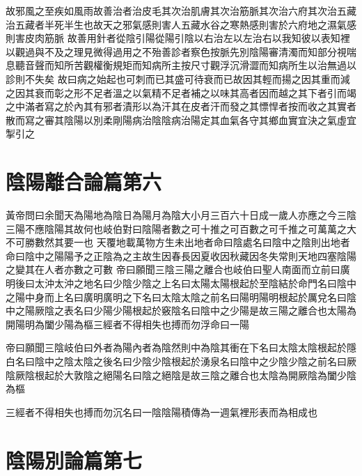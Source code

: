 故邪風之至疾如風雨故善治者治皮毛其次治肌膚其次治筋脈其次治六府其次治五藏治五藏者半死半生也故天之邪氣感則害人五藏水谷之寒熱感則害於六府地之濕氣感則害皮肉筋脈
故善用針者從陰引陽從陽引陰以右治左以左治右以我知彼以表知裡以觀過與不及之理見微得過用之不殆善診者察色按脈先別陰陽審清濁而知部分視喘息聽音聲而知所苦觀權衡規矩而知病所主按尺寸觀浮沉滑澀而知病所生以治無過以診則不失矣
故曰病之始起也可刺而已其盛可待衰而已故因其輕而揚之因其重而減之因其衰而彰之形不足者溫之以氣精不足者補之以味其高者因而越之其下者引而竭之中滿者寫之於內其有邪者漬形以為汗其在皮者汗而發之其慓悍者按而收之其實者散而寫之審其陰陽以別柔剛陽病治陰陰病治陽定其血氣各守其鄉血實宜決之氣虛宜掣引之

\section{陰陽離合論篇第六}

黃帝問曰余聞天為陽地為陰日為陽月為陰大小月三百六十日成一歲人亦應之今三陰三陽不應陰陽其故何也岐伯對曰陰陽者數之可十推之可百數之可千推之可萬萬之大不可勝數然其要一也
天覆地載萬物方生未出地者命曰陰處名曰陰中之陰則出地者命曰陰中之陽陽予之正陰為之主故生因春長因夏收因秋藏因冬失常則天地四塞陰陽之變其在人者亦數之可數
帝曰願聞三陰三陽之離合也岐伯曰聖人南面而立前曰廣明後曰太沖太沖之地名曰少陰少陰之上名曰太陽太陽根起於至陰結於命門名曰陰中之陽中身而上名曰廣明廣明之下名曰太陰太陰之前名曰陽明陽明根起於厲兌名曰陰中之陽厥陰之表名曰少陽少陽根起於竅陰名曰陰中之少陽是故三陽之離合也太陽為開陽明為闔少陽為樞三經者不得相失也搏而勿浮命曰一陽

帝曰願聞三陰岐伯曰外者為陽內者為陰然則中為陰其衝在下名曰太陰太陰根起於隱白名曰陰中之陰太陰之後名曰少陰少陰根起於湧泉名曰陰中之少陰少陰之前名曰厥陰厥陰根起於大敦陰之絕陽名曰陰之絕陰是故三陰之離合也太陰為開厥陰為闔少陰為樞

三經者不得相失也搏而勿沉名曰一陰陰陽積傳為一週氣裡形表而為相成也


\section{陰陽別論篇第七}

